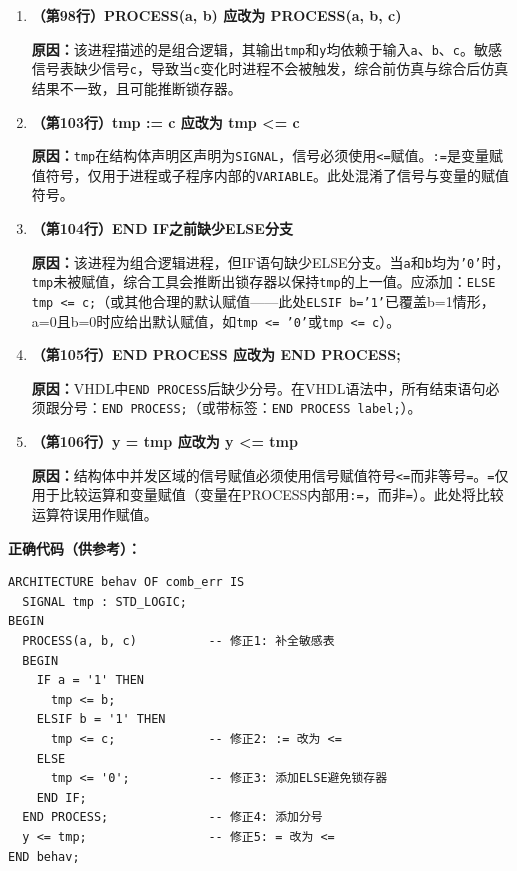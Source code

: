 \begin{enumerate}[label=\textbf{错误\arabic*：}]

\item \textbf{（第98行）PROCESS(a, b) 应改为 PROCESS(a, b, c)}

\textbf{原因：}该进程描述的是组合逻辑，其输出\texttt{tmp}和\texttt{y}均依赖于输入\texttt{a}、\texttt{b}、\texttt{c}。敏感信号表缺少信号\texttt{c}，导致当\texttt{c}变化时进程不会被触发，综合前仿真与综合后仿真结果不一致，且可能推断锁存器。

\item \textbf{（第103行）tmp := c 应改为 tmp <= c}

\textbf{原因：}\texttt{tmp}在结构体声明区声明为\texttt{SIGNAL}，信号必须使用\texttt{<=}赋值。\texttt{:=}是变量赋值符号，仅用于进程或子程序内部的\texttt{VARIABLE}。此处混淆了信号与变量的赋值符号。

\item \textbf{（第104行）END IF之前缺少ELSE分支}

\textbf{原因：}该进程为组合逻辑进程，但IF语句缺少ELSE分支。当\texttt{a}和\texttt{b}均为\texttt{'0'}时，\texttt{tmp}未被赋值，综合工具会推断出锁存器以保持\texttt{tmp}的上一值。应添加：\texttt{ELSE tmp <= c;}（或其他合理的默认赋值——此处\texttt{ELSIF b='1'}已覆盖b=1情形，a=0且b=0时应给出默认赋值，如\texttt{tmp <= '0'}或\texttt{tmp <= c}）。

\item \textbf{（第105行）END PROCESS 应改为 END PROCESS;}

\textbf{原因：}VHDL中\texttt{END PROCESS}后缺少分号。在VHDL语法中，所有结束语句必须跟分号：\texttt{END PROCESS;}（或带标签：\texttt{END PROCESS label;}）。

\item \textbf{（第106行）y = tmp 应改为 y <= tmp}

\textbf{原因：}结构体中并发区域的信号赋值必须使用信号赋值符号\texttt{<=}而非等号\texttt{=}。\texttt{=}仅用于比较运算和变量赋值（变量在PROCESS内部用\texttt{:=}，而非\texttt{=}）。此处将比较运算符误用作赋值。

\end{enumerate}

\begin{framed}
\textbf{正确代码（供参考）：}
\begin{lstlisting}[language=VDL]
ARCHITECTURE behav OF comb_err IS
  SIGNAL tmp : STD_LOGIC;
BEGIN
  PROCESS(a, b, c)          -- 修正1: 补全敏感表
  BEGIN
    IF a = '1' THEN
      tmp <= b;
    ELSIF b = '1' THEN
      tmp <= c;             -- 修正2: := 改为 <=
    ELSE
      tmp <= '0';           -- 修正3: 添加ELSE避免锁存器
    END IF;
  END PROCESS;              -- 修正4: 添加分号
  y <= tmp;                 -- 修正5: = 改为 <=
END behav;
\end{lstlisting}
\end{framed}

